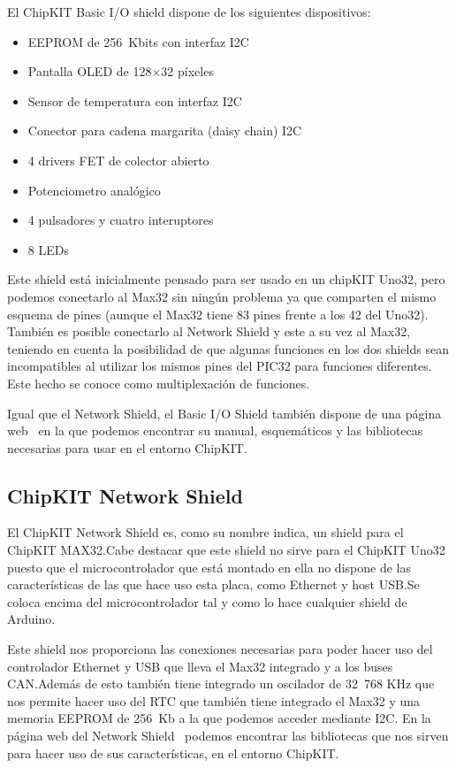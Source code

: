 
El ChipKIT Basic I/O shield dispone de los siguientes dispositivos:
\begin{itemize}
	\item EEPROM de 256~Kbits con interfaz I2C
	\item Pantalla OLED de 128$\times$32 píxeles
	\item Sensor de temperatura con interfaz I2C
	\item Conector para cadena margarita (daisy chain) I2C
	\item 4 drivers FET de colector abierto
	\item Potenciometro analógico
	\item 4 pulsadores y cuatro interuptores
	\item 8 LEDs
\end{itemize}

Este shield está inicialmente pensado para ser usado en un chipKIT Uno32, pero podemos conectarlo al Max32 sin ningún problema ya que comparten el mismo esquema de pines (aunque el Max32 tiene 83 pines frente a los 42 del Uno32). También es posible conectarlo al Network Shield y este a su vez al Max32, teniendo en cuenta la posibilidad de que algunas funciones en los dos shields sean incompatibles al utilizar los mismos pines del PIC32 para funciones diferentes. Este hecho se conoce como multiplexación de funciones.

Igual que el Network Shield, el Basic I/O Shield también dispone de una página web~\cite{website:io_shield} en la que podemos encontrar su manual, esquemáticos y las bibliotecas necesarias para usar en el entorno ChipKIT.\@
\subsection{ChipKIT Network Shield}

El ChipKIT Network Shield es, como su nombre indica, un shield para el ChipKIT MAX32.\@ Cabe destacar que este shield no sirve para el ChipKIT Uno32 puesto que el microcontrolador que está montado en ella no dispone de las características de las que hace uso esta placa, como Ethernet y host USB.\@ Se coloca encima del microcontrolador tal y como lo hace cualquier shield de Arduino.


Este shield nos proporciona las conexiones necesarias para poder hacer uso del controlador Ethernet y USB que lleva el Max32 integrado y a los buses CAN.\@ Además de esto también tiene integrado un oscilador de 32~768 KHz que nos permite hacer uso del RTC que también tiene integrado el Max32 y una memoria EEPROM de 256~Kb a la que podemos acceder mediante I2C. En la página web del Network Shield~\cite{website:network_shield} podemos encontrar las bibliotecas que nos sirven para hacer uso de sus características, en el entorno ChipKIT.\@

